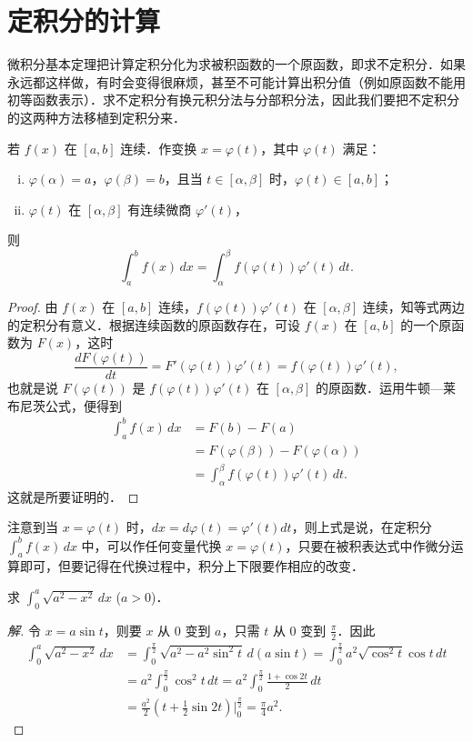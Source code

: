 \section{定积分的计算}\label{sec:7-4}

微积分基本定理把计算定积分化为求被积函数的一个原函数，即求不定积分．如果永远都这样做，有时会变得很麻烦，甚至不可能计算出积分值（例如原函数不能用初等函数表示）．求不定积分有换元积分法与分部积分法，因此我们要把不定积分的这两种方法移植到定积分来．

\begin{theorem}[定积分换元法则]\label{thm:7-13}
若 $f(x)$ 在 $[a,b]$ 连续．作变换 $x = \varphi(t)$，其中 $\varphi(t)$ 满足：
\begin{enumerate}[(i)]
\item $\varphi(\alpha) = a$，$\varphi(\beta) = b$，且当 $t \in [\alpha,\beta]$ 时，$\varphi(t) \in [a,b]$；
\item $\varphi(t)$ 在 $[\alpha,\beta]$ 有连续微商 $\varphi'(t)$，
\end{enumerate}
则
\[
\int_a^b f(x)\,dx = \int_\alpha^\beta f(\varphi(t))\varphi'(t)\,dt.
\]
\end{theorem}

\begin{proof}
由 $f(x)$ 在 $[a,b]$ 连续，$f(\varphi(t))\varphi'(t)$ 在 $[\alpha,\beta]$ 连续，知等式两边的定积分有意义．根据连续函数的原函数存在，可设 $f(x)$ 在 $[a,b]$ 的一个原函数为 $F(x)$，这时
\[
\frac{d F(\varphi(t))}{dt} = F'(\varphi(t))\varphi'(t) = f(\varphi(t))\varphi'(t),
\]
也就是说 $F(\varphi(t))$ 是 $f(\varphi(t))\varphi'(t)$ 在 $[\alpha,\beta]$ 的原函数．运用牛顿---莱布尼茨公式，便得到
\begin{align*}
\int_a^b f(x)\,dx &= F(b) - F(a) \\
&= F(\varphi(\beta)) - F(\varphi(\alpha)) \\
&= \int_\alpha^\beta f(\varphi(t))\varphi'(t)\,dt.
\end{align*}
这就是所要证明的．
\end{proof}

注意到当 $x = \varphi(t)$ 时，$dx = d\varphi(t) = \varphi'(t)dt$，则上式是说，在定积分 $\int_a^b f(x)\,dx$ 中，可以作任何变量代换 $x = \varphi(t)$，只要在被积表达式中作微分运算即可，但要记得在代换过程中，积分上下限要作相应的改变．

\begin{example}
求 $\displaystyle \int_0^a \sqrt{a^2 - x^2}\,dx$ ($a > 0$)．
\end{example}

\begin{proof}[解]
令 $x = a\sin t$，则要 $x$ 从 $0$ 变到 $a$，只需 $t$ 从 $0$ 变到 $\frac{\pi}{2}$．因此
\begin{align*}
\int_0^a \sqrt{a^2 - x^2}\,dx &= \int_0^{\frac{\pi}{2}}\sqrt{a^2 - a^2\sin^2 t}\,d(a\sin t) = \int_0^{\frac{\pi}{2}}a^2\sqrt{\cos^2 t}\cos t\,dt \\
&= a^2\int_0^{\frac{\pi}{2}}\cos^2 t\,dt = a^2\int_0^{\frac{\pi}{2}}\frac{1 + \cos 2t}{2}\,dt \\
&= \frac{a^2}{2}\left(t + \frac{1}{2}\sin 2t\right)\bigg|_0^{\frac{\pi}{2}} = \frac{\pi}{4}a^2.
\end{align*}
\end{proof}

